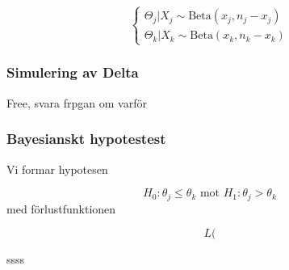 \documentclass{article}
\begin{document}
\[
\begin{cases}
    \Theta_j|X_j\sim \text{Beta}(x_j,n_j-x_j)\\
    \Theta_k|X_k\sim \text{Beta}(x_k,n_k-x_k)
\end{cases}
\]


\subsubsection{Simulering av Delta}

Free, svara frpgan om varför

\subsubsection{Bayesianskt hypotestest}

Vi formar hypotesen

\[
H_0:\theta_j\leq \theta_k \text{ mot } H_1:\theta_j>\theta_k
\]
med förlustfunktionen

\[
L(
\]

ssss
\end{document}
